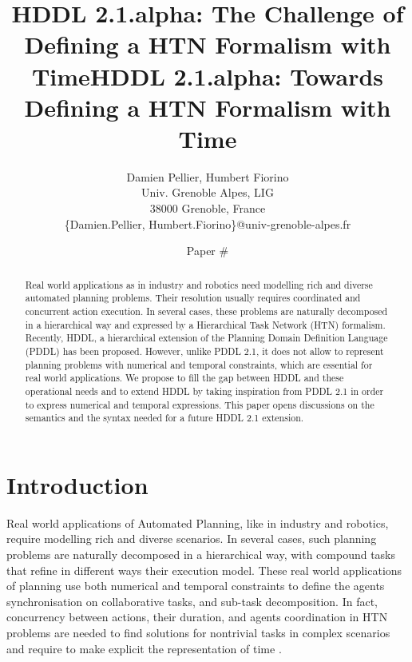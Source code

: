 \documentclass[letterpaper]{article} %
\title{HDDL 2.1.alpha: The Challenge of Defining a HTN Formalism with Time}
\author{
Damien Pellier, Humbert Fiorino\\
Univ. Grenoble Alpes, LIG\\
38000 Grenoble, France\\
\{Damien.Pellier, Humbert.Fiorino\}@univ-grenoble-alpes.fr}
\title{HDDL 2.1.alpha: Towards Defining a HTN Formalism with Time}
\author{Paper \# \vspace{-1cm}}
\begin{document}
\maketitle

\begin{abstract}
Real world applications as in industry and robotics need modelling rich and diverse automated planning problems. Their resolution usually requires coordinated and concurrent action execution. In several cases, these problems are naturally decomposed in a hierarchical way and expressed by a Hierarchical Task Network (HTN) formalism. Recently, HDDL, a hierarchical extension of the Planning Domain Definition Language (PDDL) has been proposed. However, unlike PDDL 2.1, it does not allow to represent planning problems with numerical and temporal constraints, which are essential for real world applications. We propose to fill the gap between HDDL and these operational needs and to extend HDDL by taking inspiration from  PDDL 2.1 in order to express numerical and temporal expressions. This paper opens discussions on the semantics and the syntax needed for a future HDDL 2.1 extension.
\end{abstract}


\section{Introduction}

Real world applications of Automated Planning, like in industry and robotics, require modelling rich and diverse scenarios.
In several cases, such  planning problems are naturally decomposed in a hierarchical way, with compound tasks that refine in different ways their execution model.
These real world applications of planning use both numerical and temporal constraints to define the agents synchronisation on collaborative tasks, and sub-task decomposition. In fact, concurrency between actions, their duration, and agents coordination in HTN problems are needed to find solutions for nontrivial tasks in complex scenarios and require to make explicit the representation of time \citep{ghallabnautraverso2016}.
\end{document}
